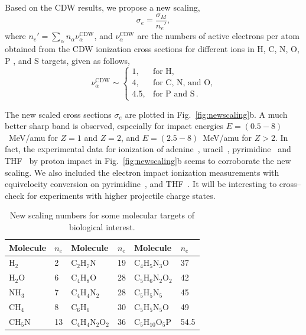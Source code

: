 \documentclass[preprint]{revtex4-2}
\begin{document}
Based on the CDW results, we propose a new scaling,
\begin{equation}
\sigma_{e}=\frac{\sigma_M}{n_e'},
\label{32} 
\end{equation}
where $n_e'=\sum_{\alpha}n_{\alpha}\nu_{\alpha}^{\text{CDW}}$, and 
$\nu_{\alpha}^{\text{CDW}}$ are the numbers of active electrons
per atom obtained from the CDW ionization cross sections for 
different ions in H, C, N, O, P , and S targets, given as follows,
\begin{equation}
\nu_{\alpha }^{\text{CDW}} \sim\left\{ 
\begin{array}{ll}
1, & \text{for H,} \\
4, & \text{for C, N, and O,} \\ 
4.5, & \text{for P and S}\,.
\end{array}
\right. 
\label{eq:scalingCDW}
\end{equation}

The new scaled cross sections $\sigma_{e}$ are plotted in 
Fig.~\ref{fig:newscaling}b. 
A much better sharp band is observed, especially for impact energies 
$E=(0.5-8)$~MeV/amu for $Z=1$ and $Z=2$, and $E=(2.5-8)$~MeV/amu for 
$Z>2$. In fact, the experimental data for ionization of 
adenine~\cite{iriki2011}, uracil~\cite{itoh2013}, 
pyrimidine~\cite{wolff2014} and THF~\cite{wang2016} by proton impact in
Fig.~\ref{fig:newscaling}b seems to corroborate the new scaling. 
We also included the electron impact ionization measurements with 
equivelocity conversion on pyrimidine~\cite{bug2017}, and 
THF~\cite{bug2017,wolf2019,fuss2009}. 
It will be interesting to cross--check for experiments with higher 
projectile charge states. 

\begin{table}[H]
\begin{center}
\begin{tabular}{|ll|ll|ll|}
\hline
 Molecule & $n_e$ &Molecule          & $n_e$ & Molecule             & $n_e$\\
\hline
 H$_2$    & 2  & C$_2$H$_7$N         & 19    & C$_4$H$_5$N$_3$O     & 37   \\
 H$_2$O   & 6  & C$_4$H$_8$O         & 28    & C$_5$H$_6$N$_2$O$_2$ & 42   \\
 NH$_3$   & 7  & C$_4$H$_4$N$_2$     & 28    & C$_5$H$_5$N$_5$      & 45   \\
 CH$_4$   & 8  & C$_6$H$_6$          & 30    & C$_5$H$_5$N$_5$O     & 49   \\
 CH$_5$N  & 13 & C$_4$H$_4$N$_2$O$_2$& 36    & C$_5$H$_{10}$O$_5$P  & 54.5 \\
 \hline
\end{tabular}
\caption{New scaling numbers for some molecular targets of biological 
interest.}
\label{nn}
\end{center}
\end{table}
\end{document}
